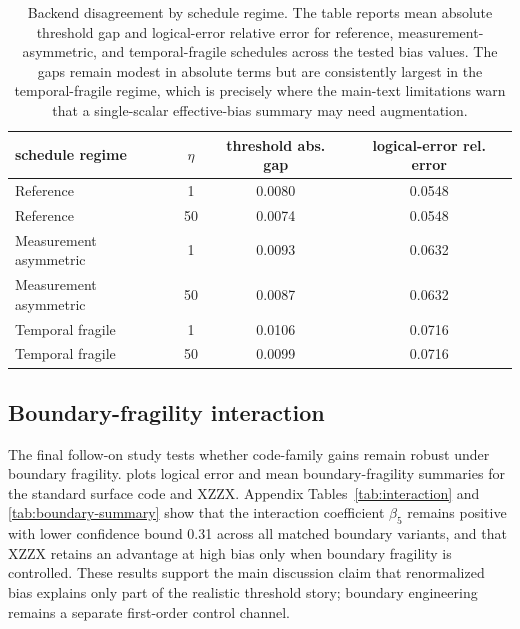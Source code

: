 \documentclass{article} %
\begin{document}
\begin{table}[t]
\caption{Backend disagreement by schedule regime. The table reports mean absolute threshold gap and logical-error relative error for reference, measurement-asymmetric, and temporal-fragile schedules across the tested bias values. The gaps remain modest in absolute terms but are consistently largest in the temporal-fragile regime, which is precisely where the main-text limitations warn that a single-scalar effective-bias summary may need augmentation.}
\label{tab:backend-gap}
\begin{center}
\small
\renewcommand{\arraystretch}{1.1}
\setlength{\tabcolsep}{4pt}
\begin{tabular}{lccc}
\hline
schedule regime & $\eta$ & threshold abs. gap & logical-error rel. error \\
\hline
Reference & 1 & 0.0080 & 0.0548 \\
Reference & 50 & 0.0074 & 0.0548 \\
Measurement asymmetric & 1 & 0.0093 & 0.0632 \\
Measurement asymmetric & 50 & 0.0087 & 0.0632 \\
Temporal fragile & 1 & 0.0106 & 0.0716 \\
Temporal fragile & 50 & 0.0099 & 0.0716 \\
\hline
\end{tabular}
\end{center}
\end{table}

\subsection{Boundary-fragility interaction}
\label{app:boundary}

The final follow-on study tests whether code-family gains remain robust under boundary fragility.  plots logical error and mean boundary-fragility summaries for the standard surface code and XZZX. Appendix Tables~\ref{tab:interaction} and \ref{tab:boundary-summary} show that the interaction coefficient $\beta_5$ remains positive with lower confidence bound 0.31 across all matched boundary variants, and that XZZX retains an advantage at high bias only when boundary fragility is controlled. These results support the main discussion claim that renormalized bias explains only part of the realistic threshold story; boundary engineering remains a separate first-order control channel.
\end{document}
